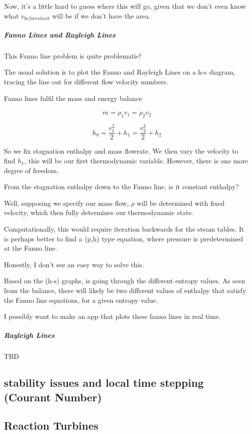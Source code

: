 \documentclass[masters]{ucbthesis}
\renewcommand{\_}{\kern-1.5pt\textunderscore\kern-1.5pt}
\begin{document}
Now, it's a little hard to guess where this will go, given that we 
don't even know what $v_{beforeshock}$ will be if we don't have the area.

\subparagraph{Fanno Lines and Rayleigh Lines}
This Fanno line problem is quite problematic!

The usual solution is to plot the Fanno and Rayleigh Lines on a h-s 
diagram, tracing the line out for different flow velocity numbers.

Fanno lines fulfil the mass and energy balance 

\begin{equation*}
	\dot{m} = \rho_1 v_1 = \rho_2 v_2
\end{equation*}


\begin{equation*}
	h_0 = \frac{v^2_1}{2} + h_1 = \frac{v^2_2}{2} + h_2
\end{equation*}

So we fix stagnation enthalpy and mass flowrate. We then vary the velocity 
to find $h_1$, this will be our first thermodynamic variable. 
However, there is one more degree of freedom. 

From the stagnation enthalpy down to the Fanno line, is it constant 
enthalpy?

Well, supposing we specify our mass flow, $\rho$ will be determined with 
fixed velocity, which then fully determines our thermodynamic state.

Computationally, this would require iteration backwards for the steam 
tables. It is perhaps better to find a (p,h) type equation, where pressure 
is predetermined at the Fanno line.

Honestly, I don't see an easy way to solve this.

Based on the (h-s) graphs, is going through the different entropy 
values. As seen from the balance, there will likely be two different values 
of enthalpy that satisfy the Fanno line equations, for a given entropy 
value.

I possibly want to make an app that plots these fanno lines in real time.

\subparagraph{Rayleigh Lines}

TBD 


\subsection{stability issues and local time stepping (Courant Number)}


\subsection{Reaction Turbines}
\end{document}
